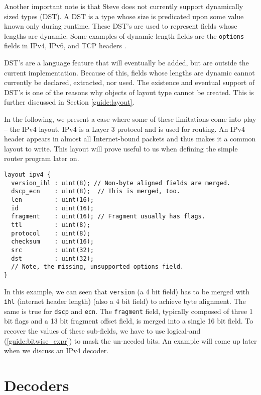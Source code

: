 Another important note is that Steve does not currently support dynamically sized types (DST). A DST is a type whose size is predicated upon some value known only during runtime. These DST's are used to represent fields whose lengths are dynamic. Some examples of dynamic length fields are the \texttt{options} fields in IPv4, IPv6, and TCP headers \cite{ipv4_std, ipv6_std, tcp_std}.

DST's are a language feature that will eventually be added, but are outside the current implementation. Because of this, fields whose lengths are dynamic cannot currently be declared, extracted, nor used. The existence and eventual support of DST's is one of the reasons why objects of layout type cannot be created. This is further discussed in Section \ref{guide:layout}.

In the following, we present a case where some of these limitations come into play -- the IPv4 layout. IPv4 is a Layer 3 protocol \cite{osi_model} and is used for routing. An IPv4 header appears in almost all Internet-bound packets and thus makes it a common layout to write. This layout will prove useful to us when defining the simple router program later on.

\begin{codepage}
\begin{lstlisting}
layout ipv4 {
  version_ihl : uint(8); // Non-byte aligned fields are merged.
  dscp_ecn    : uint(8);  // This is merged, too.
  len         : uint(16);
  id          : uint(16);
  fragment    : uint(16); // Fragment usually has flags.
  ttl         : uint(8);
  protocol    : uint(8);
  checksum    : uint(16);
  src         : uint(32);
  dst         : uint(32);
  // Note, the missing, unsupported options field.
}
\end{lstlisting}
\end{codepage}

In this example, we can seen that \texttt{version} (a 4 bit field) has to be merged with \texttt{ihl} (internet header length) (also a 4 bit field) to achieve byte alignment. The same is true for \texttt{dscp} and \texttt{ecn}. The \texttt{fragment} field, typically composed of three 1 bit flags and a 13 bit fragment offset field, is merged into a single 16 bit field. To recover the values of these sub-fields, we have to use logical-and (\ref{guide:bitwise_expr}) to mask the un-needed bits. An example will come up later when we discuss an IPv4 decoder.

\section{Decoders} \label{tut:decoder}

